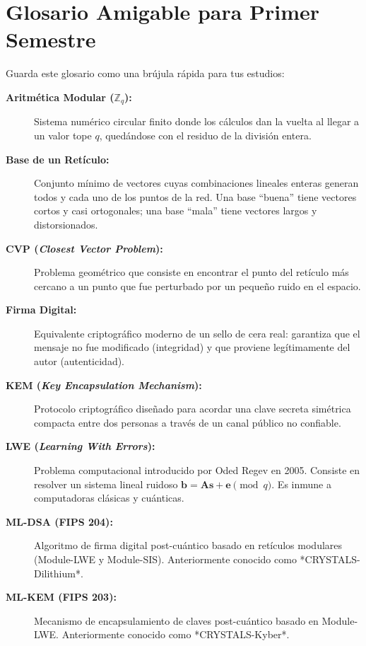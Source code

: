 \section{Glosario Amigable para Primer Semestre}

Guarda este glosario como una brújula rápida para tus estudios:

\begin{description}
  \item[\textbf{Aritmética Modular ($\mathbb{Z}_q$):}] Sistema numérico circular finito donde los cálculos dan la vuelta al llegar a un valor tope $q$, quedándose con el residuo de la división entera.
  
  \item[\textbf{Base de un Retículo:}] Conjunto mínimo de vectores cuyas combinaciones lineales enteras generan todos y cada uno de los puntos de la red. Una base ``buena'' tiene vectores cortos y casi ortogonales; una base ``mala'' tiene vectores largos y distorsionados.
  
  \item[\textbf{CVP (\textit{Closest Vector Problem}):}] Problema geométrico que consiste en encontrar el punto del retículo más cercano a un punto que fue perturbado por un pequeño ruido en el espacio.
  
  \item[\textbf{Firma Digital:}] Equivalente criptográfico moderno de un sello de cera real: garantiza que el mensaje no fue modificado (integridad) y que proviene legítimamente del autor (autenticidad).
  
  \item[\textbf{KEM (\textit{Key Encapsulation Mechanism}):}] Protocolo criptográfico diseñado para acordar una clave secreta simétrica compacta entre dos personas a través de un canal público no confiable.
  
  \item[\textbf{LWE (\textit{Learning With Errors}):}] Problema computacional introducido por Oded Regev en 2005. Consiste en resolver un sistema lineal ruidoso $\mathbf{b} = \mathbf{A}\mathbf{s} + \mathbf{e} \pmod q$. Es inmune a computadoras clásicas y cuánticas.
  
  \item[\textbf{ML-DSA (FIPS 204):}] Algoritmo de firma digital post-cuántico basado en retículos modulares (Module-LWE y Module-SIS). Anteriormente conocido como *CRYSTALS-Dilithium*.
  
  \item[\textbf{ML-KEM (FIPS 203):}] Mecanismo de encapsulamiento de claves post-cuántico basado en Module-LWE. Anteriormente conocido como *CRYSTALS-Kyber*.
  

\end{description}

